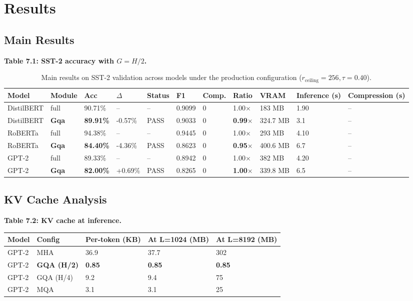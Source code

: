 
\section{Results}

\subsection{Main Results}

\textbf{Table 7.1: SST-2 accuracy with $G = H/2$.}

\begin{table}[t]
\centering
\small
\begin{tabular}{lllllllllll}
\toprule
\textbf{Model} & \textbf{Module} & \textbf{Acc} & \textbf{$\Delta$} & \textbf{Status} & \textbf{F1} & \textbf{Comp.} & \textbf{Ratio} & \textbf{VRAM} & \textbf{Inference (s)} & \textbf{Compression (s)} \\
\midrule
DistilBERT & full & 90.71\% & -- & -- & 0.9099 & 0 & 1.00$\times$ & 183 MB & 1.90 & -- \\
DistilBERT & \textbf{Gqa} & \textbf{89.91\%} & -0.57\% & PASS & 0.9033 & 0 & \textbf{0.99$\times$} & 324.7 MB & 3.1 & -- \\
RoBERTa & full & 94.38\% & -- & -- & 0.9445 & 0 & 1.00$\times$ & 293 MB & 4.10 & -- \\
RoBERTa & \textbf{Gqa} & \textbf{84.40\%} & -4.36\% & PASS & 0.8623 & 0 & \textbf{0.95$\times$} & 400.6 MB & 6.7 & -- \\
GPT-2 & full & 89.33\% & -- & -- & 0.8942 & 0 & 1.00$\times$ & 382 MB & 4.20 & -- \\
GPT-2 & \textbf{Gqa} & \textbf{82.00\%} & +0.69\% & PASS & 0.8265 & 0 & \textbf{1.00$\times$} & 339.8 MB & 6.5 & -- \\
\bottomrule
\end{tabular}
\caption{Main results on SST-2 validation across models under the production configuration ($r_{\mathrm{ceiling}}=256, \tau=0.40$).}
\label{tab:main_sst2}
\end{table}

\subsection{KV Cache Analysis}

\textbf{Table 7.2: KV cache at inference.}

\begin{table}[H]
\centering
\small
\begin{tabular}{lllll}
\toprule
\textbf{Model} & \textbf{Config} & \textbf{Per-token (KB)} & \textbf{At L=1024 (MB)} & \textbf{At L=8192 (MB)} \\
\midrule
GPT-2 & MHA & 36.9 & 37.7 & 302 \\
GPT-2 & \textbf{GQA (H/2)} & \textbf{0.85} & \textbf{0.85} & \textbf{0.85} \\
GPT-2 & GQA (H/4) & 9.2 & 9.4 & 75 \\
GPT-2 & MQA & 3.1 & 3.1 & 25 \\
\bottomrule
\end{tabular}
\end{table}

